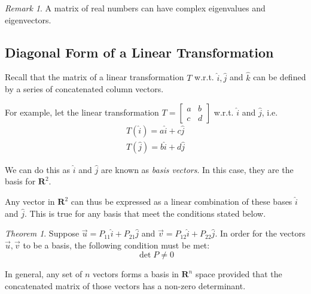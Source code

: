 \documentclass[a4paper]{article}
\theoremstyle{remark}
\newtheorem*{remark}{Remark}
\theoremstyle{theorem}
\newtheorem{theorem}{Theorem}
\begin{document}
\begin{remark}
	A matrix of real numbers can have complex eigenvalues and eigenvectors.
\end{remark}

\subsection{Diagonal Form of a Linear Transformation}
Recall that the matrix of a linear transformation $T$ w.r.t. $\hat{i}, \hat{j}$ and $\hat{k}$ can be defined by a series of concatenated column vectors.

For example, let the linear transformation $T = \begin{bmatrix} a & b \\ c & d\end{bmatrix}$ w.r.t. $\hat{i}$ and $\hat{j}$, i.e.
\begin{align}
	T(\hat{i}) = a\hat{i} + c\hat{j} \\
	T(\hat{j}) = b\hat{i} + d\hat{j}
\end{align}

We can do this as $\hat{i}$ and $\hat{j}$ are known as \emph{basis vectors}.
In this case, they are the basis for $\mathbf{R}^2$.

Any vector in $\mathbf{R}^2$ can thus be expressed as a linear combination of these bases $\hat{i}$ and $\hat{j}$.
This is true for any basis that meet the conditions stated below.

\begin{theorem}
	Suppose $\vec{u} = P_{11}\hat{i} + P_{21}\hat{j}$ and $\vec{v} = P_{12}\hat{i} + P_{22}\hat{j}$.
	In order for the vectors $\vec{u},\vec{v}$ to be a basis, the following condition must be met:
	\begin{equation}
		\det{P} \neq 0
	\end{equation}

	In general, any set of $n$ vectors forms a basis in $\mathbf{R}^n$ space provided that the concatenated matrix of those vectors has a non-zero determinant.
\end{theorem}
\end{document}
